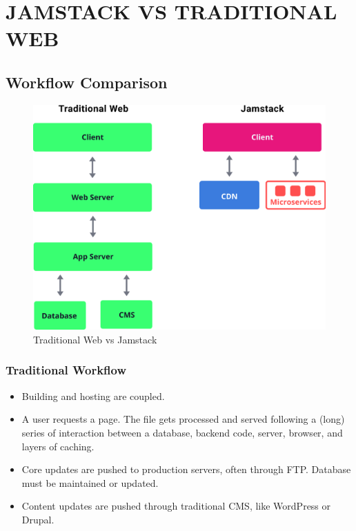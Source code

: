 \documentclass[12pt,a4paper,oneside]{report}
\begin{document}
\chapter{JAMSTACK VS TRADITIONAL WEB}

\section{Workflow Comparison}

\begin{figure}[H]
    \centering
    \includegraphics[scale=1]{images/comparison.png}
    \caption{Traditional Web vs Jamstack\cite{official}}
\end{figure}

\subsection{Traditional Workflow}
\begin{itemize}
    \item Building and hosting are coupled.
    \item A user requests a page. The file gets processed and served following a (long) series of interaction between a database, backend code, server, browser, and layers of caching.
    \item  Core updates are pushed to production servers, often through FTP. Database must be maintained or updated.
    \item  Content updates are pushed through traditional CMS, like WordPress or Drupal.
\end{itemize}
\end{document}
